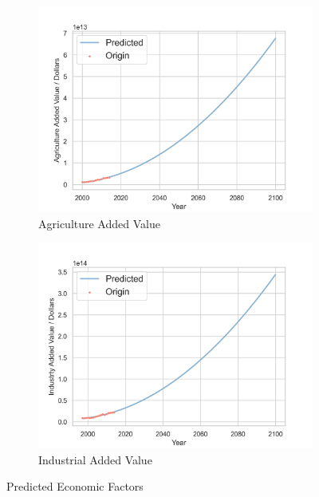 \documentclass[12pt]{article}
\begin{document}
    \begin{figure}[hbt]
        \centering
        \begin{subfigure}[]{0.4\textwidth}
            \includegraphics[width = \textwidth]{fig/projection/Agriculture_Added_Value.png}
            \caption{Agriculture Added Value}
        \end{subfigure}
        \begin{subfigure}[]{0.4\textwidth}
            \includegraphics[width = \textwidth]{fig/projection/Industrty_Added_Value.png}
            \caption{Industrial Added Value}
        \end{subfigure}
    \caption{Predicted Economic Factors}
\end{figure}
\end{document}
